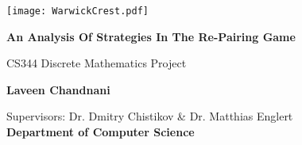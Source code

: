 \thispagestyle{empty}

\vspace*{\fill}
\begin{spacing}{2}
    \begin{center}
        \texttt{[image: WarwickCrest.pdf]}
    \end{center}
    \vspace{5mm}
    \begin{center}
        \textbf{\LARGE An Analysis Of Strategies In The Re-Pairing Game}
  
		\vspace{5mm}
	\end{center}
	\begin{center}
		{\large CS344 Discrete Mathematics Project}\\
	\end{center}
	\begin{center}
        \vspace{20mm}
		\textbf{\large Laveen Chandnani}
		\vspace{20mm}
	\end{center}
	\begin{center}
	     {\large Supervisors: Dr. Dmitry Chistikov \& Dr. Matthias Englert }\\
		\textbf{\large Department of Computer Science}\\
	\end{center}
    
\end{spacing}
\vspace*{\fill}